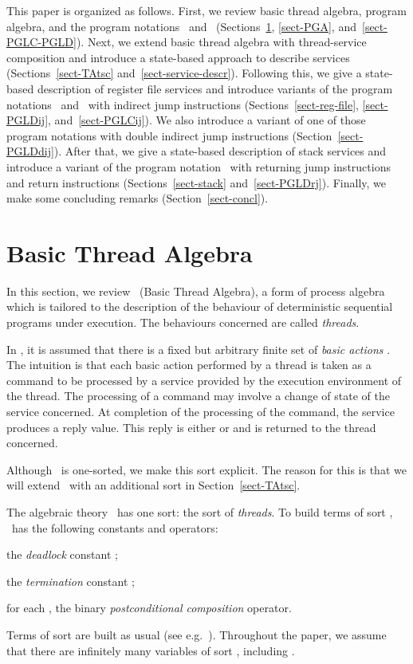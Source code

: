\documentclass[fleqn]{llncs}
\begin{document}
This paper is organized as follows.
First, we review basic thread algebra, program algebra, and the program
notations \PGLC\ and \PGLD\
(Sections~\ref{sect-BTA}, \ref{sect-PGA}, and~\ref{sect-PGLC-PGLD}).
Next, we extend basic thread algebra with thread-service composition and
introduce a state-based approach to describe services
(Sections~\ref{sect-TAtsc} and~\ref{sect-service-descr}).
Following this, we give a state-based description of register file
services and introduce variants of the program notations \PGLC\ and
\PGLD\ with indirect jump instructions
(Sections~\ref{sect-reg-file}, \ref{sect-PGLDij}, and~\ref{sect-PGLCij}).
We also introduce a variant of one of those program notations with
double indirect jump instructions (Section~\ref{sect-PGLDdij}).
After that, we give a state-based description of stack services and
introduce a variant of the program notation \PGLD\ with returning jump
instructions and return instructions
(Sections~\ref{sect-stack} and~\ref{sect-PGLDrj}).
Finally, we make some concluding remarks (Section~\ref{sect-concl}).


\section{Basic Thread Algebra}
\label{sect-BTA}

In this section, we review \BTA\ (Basic Thread Algebra), a form of
process algebra which is tailored to the description of the behaviour of
deterministic sequential programs under execution.
The behaviours concerned are called \emph{threads}.

In \BTA, it is assumed that there is a fixed but arbitrary finite set of
\emph{basic actions} .
The intuition is that each basic action performed by a thread is taken
as a command to be processed by a service provided by the execution
environment of the thread.
The processing of a command may involve a change of state of the service
concerned.
At completion of the processing of the command, the service produces a
reply value.
This reply is either  or  and is returned to the thread
concerned.

Although \BTA\ is one-sorted, we make this sort explicit.
The reason for this is that we will extend \BTA\ with an additional sort
in Section~\ref{sect-TAtsc}.

The algebraic theory \BTA\ has one sort: the sort  of
\emph{threads}.
To build terms of sort , \BTA\ has the following constants and
operators:
\begin{iteml}
\item
the \emph{deadlock} constant ;
\item
the \emph{termination} constant ;
\item
for each , the binary \emph{postconditional composition}
operator\linebreak .
\end{iteml}
Terms of sort  are built as usual (see e.g.~\cite{ST99a,Wir90a}).
Throughout the paper, we assume that there are infinitely many variables
of sort , including .
\end{document}
